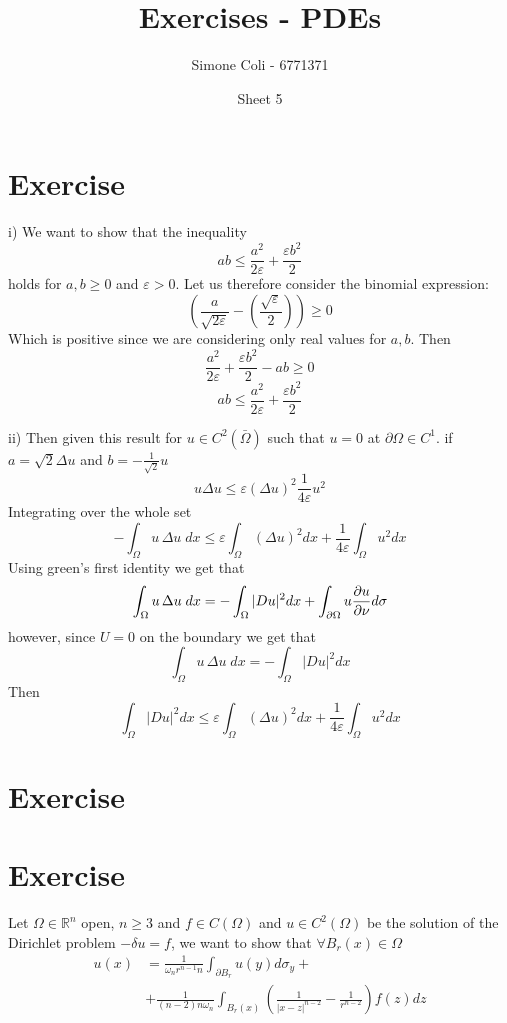 \documentclass{article}
\title{Exercises - PDEs}
\author{Simone Coli - 6771371}
\date{Sheet 5}
\newcommand{\R}{\mathbb{R}}
\begin{document}
\maketitle

\section{Exercise}

i) We want to show that the inequality
\[
    ab \leq \frac{a^2}{2 \varepsilon} + \frac{\varepsilon b^2}{2}
\]
holds for $a, b \geq 0$ and $\varepsilon > 0$. Let us therefore consider the binomial expression:
\[
    \left( \frac{a}{\sqrt{2\varepsilon}} - (\frac{\sqrt{\varepsilon}}{2})\right) \geq 0
\]
Which is positive since we are considering only real values for $a,b$. Then
\[
    \frac{a^2}{2 \varepsilon} + \frac{\varepsilon b^2}{2} - ab \geq 0
\]
\[
    ab \leq \frac{a^2}{2 \varepsilon} +\frac{\varepsilon b^2}{2}
\]

ii) Then given this result for $u \in C^2(\bar \Omega)$ such that $u = 0$ at $\partial \Omega \in C^1$. if $a = \sqrt{2} \Delta u$ and $b = - \frac{1}{\sqrt{2}}u$
\[
    u\Delta u \leq \varepsilon (\Delta u)^2 \frac{1}{4 \varepsilon} u^2
\]
Integrating over the whole set
\[
   -  \int_\Omega u \,\Delta u \;dx \leq \varepsilon \int_\Omega (\Delta u)^2 dx + \frac{1}{4\varepsilon}\int_\Omega u^2 dx
\]
Using green's first identity we get that 
\[
    \int_\Omega u \,\Delta u \;dx = -\int_\Omega |Du|^2 dx + \int_{\partial \Omega} u \pdv{u}{\nu} d\sigma 
\]
however, since $U=0$ on the boundary we get that
\[
    \int_\Omega u \,\Delta u \;dx = -\int_\Omega |Du|^2 dx
\]
Then
\[
    \int_\Omega |Du|^2 dx \leq \varepsilon \int_\Omega (\Delta u)^2 dx + \frac{1}{4\varepsilon}\int_\Omega u^2 dx
\]
\section{Exercise}
\section{Exercise}
Let $\Omega \in \R^n$ open, $n \geq 3$ and $f \in C(\Omega)$ and $u\in C^2(\Omega)$ be the solution of the Dirichlet problem $-\delta u = f$, we want to show that $\forall B_r(x) \in \Omega$
\[
    \begin{split}
        u(x) &= \frac{1}{\omega_n r^{n-1}n} \int_{\partial B_r} u(y) d\sigma_y +\\
        & + \frac{1}{(n-2) n \omega_n} \int_{B_r(x)} \left( \frac{1}{|x-z|^{n-2}} -\frac{1}{r^{n-2}} \right) f(z)dz
    \end{split}
\]
\end{document}
